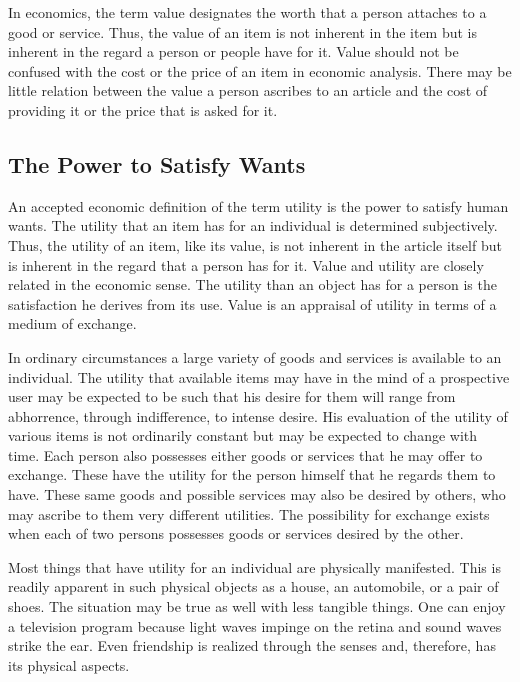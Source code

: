 In economics, the term value designates the worth that a person attaches to a good or service. Thus, the value of an item is not inherent in the item but is inherent in the regard a person or people have for it. Value should not be confused with the cost or the price of an item in economic analysis. There may be little relation between the value a person ascribes to an article and the cost of providing it or the price that is asked for it.

\subsection{The Power to Satisfy Wants}

An accepted economic definition of the term utility is the power to satisfy human wants. The utility that an item has for an individual is determined subjectively. Thus, the utility of an item, like its value, is not inherent in the article itself but is inherent in the regard that a person has for it. Value and utility are closely related in the economic sense. The utility than an object has for a person is the satisfaction he derives from its use. Value is an appraisal of utility in terms of a medium of exchange.

In ordinary circumstances a large variety of goods and services is available to an individual. The utility that available items may have in the mind of a prospective user may be expected to be such that his desire for them will range from abhorrence, through indifference, to intense desire. His evaluation of the utility of various items is not ordinarily constant but may be expected to change with time. Each person also possesses either goods or services that he may offer to exchange. These have the utility for the person himself that he regards them to have. These same goods and possible services may also be desired by others, who may ascribe to them very different utilities. The possibility for exchange exists when each of two persons possesses goods or services desired by the other.

Most things that have utility for an individual are physically manifested. This is readily apparent in such physical objects as a house, an automobile, or a pair of shoes. The situation may be true as well with less tangible things. One can enjoy a television program because light waves impinge on the retina and sound waves strike the ear. Even friendship is realized through the senses and, therefore, has its physical aspects.
    
